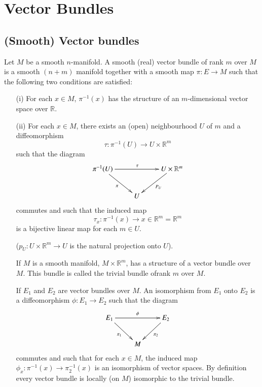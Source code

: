 \chapter{Vector Bundles}\label{chap2}

\section*{(Smooth) Vector bundles}
\pageoriginale

Let $M$ be a smooth $n$-manifold. A smooth (real) vector bundle of rank $m$ over $M$ is a smooth $(n+m)$ manifold together with a smooth map $\pi:E\to M$ such that the following two conditions are satisfied: 
\begin{itemize}
\item[(i)] For each $x\in M$, $\pi^{-1}(x)$ has the structure of an $m$-dimensional vector space over $\mathbb{R}$.

\item[(ii)] For each $x\in M$, there exists an (open) neighbourhood $U$ of $m$ and a diffeomorphism
$$
\tau : \pi^{-1}(U)\to U\times \mathbb{R}^{m}
$$
such that the diagram
\[
\xymatrix{
\pi^{-1}(U)\ar[dr]_{\pi}\ar[rr]^{\tau} & & U\times \mathbb{R}^{m}\ar[dl]^{P_{U}}\\
& U &
}
\]
commutes and such that the induced map
$$
\tau_{x}:\pi^{-1}(x)\to x\in \mathbb{R}^{m}=\mathbb{R}^{m}
$$
is a bijective linear map for each $m\in U$.

($p_{U}:U\times \mathbb{R}^{m}\to U$ is the natural projection onto $U$).

If $M$ is a smooth manifold, $M\times \mathbb{R}^{m}$, has a structure of a vector bundle over $M$. This bundle is called the trivial bundle of\pageoriginale rank $m$ over $M$.

If $E_{1}$ and $E_{2}$ are vector bundles over $M$. An isomorphism from $E_{1}$ onto $E_{2}$ is a diffeomorphism $\phi:E_{1}\to E_{2}$ such that the diagram
\[
\xymatrix{
E_{1}\ar[dr]_{\pi_{1}}\ar[rr]^{\phi} & & E_{2}\ar[dl]^{\pi_{2}}\\
 & M &
}
\]
commutes and such that for each $x\in M$, the induced map $\phi_{x}:\pi^{-1}(x)\to \pi^{-1}_{2}(x)$ is an isomorphism of vector spaces. By definition every vector bundle is locally (on $M$) isomorphic to the trivial bundle.


\end{itemize}
